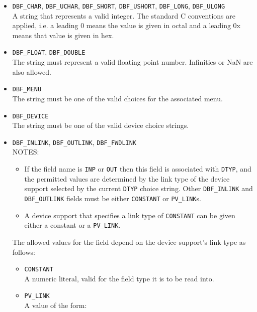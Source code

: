 \begin{description}
\begin{itemize}
\item \verb|DBF_CHAR|, \verb|DBF_UCHAR|, \verb|DBF_SHORT|, \verb|DBF_USHORT|, \verb|DBF_LONG|, \verb|DBF_ULONG| \\
A string that represents a valid integer.
The standard C conventions are applied, i.e. a leading 0 means the value is given in octal and a leading 0x means that value is given in hex.

\item \verb|DBF_FLOAT|, \verb|DBF_DOUBLE| \\
The string must represent a valid floating point number.
Infinities or NaN are also allowed.

\item \verb|DBF_MENU| \\
The string must be one of the valid choices for the associated menu.

\item \verb|DBF_DEVICE| \\
The string must be one of the valid device choice strings.

\item \verb|DBF_INLINK|, \verb|DBF_OUTLINK|, \verb|DBF_FWDLINK| \\
NOTES:

\begin{itemize}
\item If the field name is \verb|INP| or \verb|OUT| then this field is associated with \verb|DTYP|, and the permitted values are determined by the link type of the device support selected by the current \verb|DTYP| choice string.
Other \verb|DBF_INLINK| and \verb|DBF_OUTLINK| fields must be either \verb|CONSTANT| or \verb|PV_LINK|s.

\item A device support that specifies a link type of \verb|CONSTANT| can be given either a constant or a \verb|PV_LINK|.
\end{itemize}

The allowed values for the field depend on the device support's link type as follows:

\begin{itemize}
\item \verb|CONSTANT| \\
A numeric literal, valid for the field type it is to be read into.

\item \verb|PV_LINK| \\
A value of the form:


\end{itemize}
\end{itemize}
\end{description}
